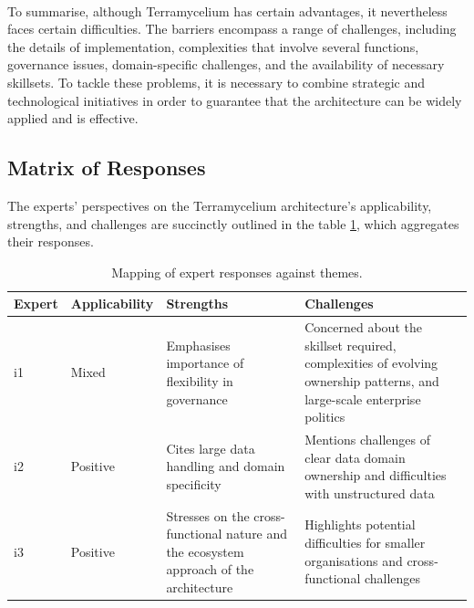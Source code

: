 \documentclass[review]{elsarticle}
\begin{document}
\,

To summarise, although Terramycelium has certain advantages, it nevertheless faces certain difficulties. The barriers encompass a range of challenges, including the details of implementation, complexities that involve several functions, governance issues, domain-specific challenges, and the availability of necessary skillsets. To tackle these problems, it is necessary to combine strategic and technological initiatives in order to guarantee that the architecture can be widely applied and is effective.

\subsection{Matrix of Responses} \label{expertOpinion_matrixResponses}

The experts' perspectives on the Terramycelium architecture's applicability, strengths, and challenges are succinctly outlined in the table \ref{tab:responses}, which aggregates their responses.

\begin{table}[h]

  \centering

  \caption{Mapping of expert responses against themes.}

  \begin{tabular}{@{}llp{}p{}@{}}

  \hline

  Expert & Applicability & Strengths & Challenges \\

  \hline

  i1 & Mixed & Emphasises importance of flexibility in governance & Concerned about the skillset required, complexities of evolving ownership patterns, and large-scale enterprise politics \\

  i2 & Positive & Cites large data handling and domain specificity & Mentions challenges of clear data domain ownership and difficulties with unstructured data \\

  i3 & Positive & Stresses on the cross-functional nature and the ecosystem approach of the architecture & Highlights potential difficulties for smaller organisations and cross-functional challenges \\

  \hline

  \end{tabular}

  \label{tab:responses}

\end{table}
\end{document}
